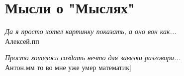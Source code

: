 \section*{Мысли о "Мыслях"}

\emph{Да я просто хотел картинку показать, а оно вон как...}\\
Алексей.пп %


\emph{Просто хотелось создать нечто для завязки разговора...}\\
Антон.мм %
то во мне уже умер математик]
